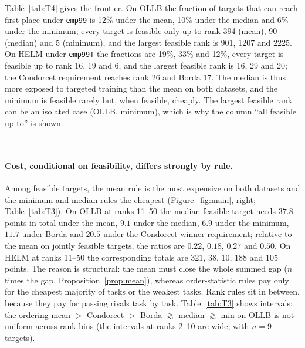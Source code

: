 \documentclass{article}
\begin{document}
Table~\ref{tab:T4} gives the frontier. On OLLB the fraction of targets that can reach first place under \texttt{emp99} is 12\% under the mean, 10\% under the median and 6\% under the minimum; every target is feasible only up to rank 394 (mean), 90 (median) and 5 (minimum), and the largest feasible rank is 901, 1207 and 2225. On HELM under \texttt{emp99T} the fractions are 19\%, 33\% and 12\%, every target is feasible up to rank 16, 19 and 6, and the largest feasible rank is 16, 29 and 20; the Condorcet requirement reaches rank 26 and Borda 17. The median is thus more exposed to targeted training than the mean on both datasets, and the minimum is feasible rarely but, when feasible, cheaply. The largest feasible rank can be an isolated case (OLLB, minimum), which is why the column ``all feasible up to'' is shown.

\begin{table}[t]
\caption{Feasibility frontier under the primary cap (\texttt{emp99} on OLLB, \texttt{emp99T} on HELM) and the oracle cap (\texttt{ceil}). \emph{share}: fraction of targets for which first place is reachable (Wilson 95\% intervals); $r^*$: largest rank under the mean among feasible targets (may be an isolated case); \emph{all feas.\ up to}: largest $r$ such that every target of rank $\le r$ is feasible; \emph{first bin $<$ 1/2}: first rank bin (bins double from rank 2) in which fewer than half are feasible. $^\dagger$: the 50 best targets under the mean only, not comparable with the score rules' fractions. Generated by \texttt{figures/src/tables.py}.}
\label{tab:T4}
\centering\scriptsize
\resizebox{\linewidth}{!}{}\\[4pt]
\resizebox{\linewidth}{!}{}
\end{table}

\paragraph{Cost, conditional on feasibility, differs strongly by rule.}
Among feasible targets, the mean rule is the most expensive on both datasets and the minimum and median rules the cheapest (Figure~\ref{fig:main}, right; Table~\ref{tab:T3}). On OLLB at ranks 11--50 the median feasible target needs $37.8$ points in total under the mean, $9.1$ under the median, $6.9$ under the minimum, $11.7$ under Borda and $20.5$ under the Condorcet-winner requirement; relative to the mean on jointly feasible targets, the ratios are $0.22$, $0.18$, $0.27$ and $0.50$. On HELM at ranks 11--50 the corresponding totals are $321$, $38$, $10$, $188$ and $105$ points. The reason is structural: the mean must close the whole summed gap ($n$ times the gap, Proposition~\ref{prop:mean}), whereas order-statistic rules pay only for the cheapest majority of tasks or the weakest tasks. Rank rules sit in between, because they pay for passing rivals task by task. Table~\ref{tab:T3} shows intervals; the ordering mean $>$ Condorcet $>$ Borda $\gtrsim$ median $\gtrsim$ min on OLLB is not uniform across rank bins (the intervals at ranks 2--10 are wide, with $n=9$ targets).
\end{document}
